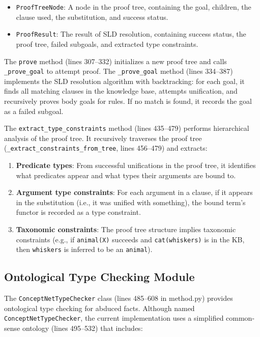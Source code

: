 \documentclass[11pt,letterpaper]{article}
\begin{document}
\begin{itemize}
    \item \texttt{ProofTreeNode}: A node in the proof tree, containing the goal, children, the clause used, the substitution, and success status.
    \item \texttt{ProofResult}: The result of SLD resolution, containing success status, the proof tree, failed subgoals, and extracted type constraints.
\end{itemize}

The \texttt{prove} method (lines 307--332) initializes a new proof tree and calls \texttt{\_prove\_goal} to attempt proof. The \texttt{\_prove\_goal} method (lines 334--387) implements the SLD resolution algorithm with backtracking: for each goal, it finds all matching clauses in the knowledge base, attempts unification, and recursively proves body goals for rules. If no match is found, it records the goal as a failed subgoal.

The \texttt{extract\_type\_constraints} method (lines 435--479) performs hierarchical analysis of the proof tree. It recursively traverses the proof tree (\texttt{\_extract\_constraints\_from\_tree}, lines 456--479) and extracts:

\begin{enumerate}
    \item \textbf{Predicate types}: From successful unifications in the proof tree, it identifies what predicates appear and what types their arguments are bound to.
    \item \textbf{Argument type constraints}: For each argument in a clause, if it appears in the substitution (i.e., it was unified with something), the bound term's functor is recorded as a type constraint.
    \item \textbf{Taxonomic constraints}: The proof tree structure implies taxonomic constraints (e.g., if \texttt{animal(X)} succeeds and \texttt{cat(whiskers)} is in the KB, then \texttt{whiskers} is inferred to be an \texttt{animal}).
\end{enumerate}

\subsection{Ontological Type Checking Module}

The \texttt{ConceptNetTypeChecker} class (lines 485--608 in method.py) provides ontological type checking for abduced facts. Although named \texttt{ConceptNetTypeChecker}, the current implementation uses a simplified common-sense ontology (lines 495--532) that includes:
\end{document}
